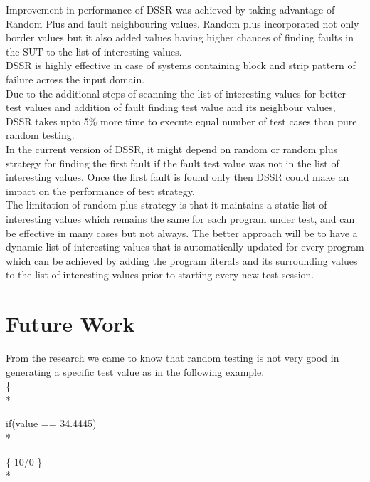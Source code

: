 \documentclass[10pt, conference, compsocconf]{IEEEtran}
\begin{document}
Improvement in performance of DSSR was achieved by taking advantage of Random Plus and fault neighbouring values. Random plus incorporated not only border values but it also added values having higher chances of finding faults in the SUT to the list of interesting values.\\

DSSR is highly effective in case of systems containing block and strip pattern of failure across the input domain.\\

Due to the additional steps of scanning the list of interesting values for better test values and addition of fault finding test value and its neighbour values, DSSR takes upto 5\% more time to execute equal number of test cases than pure random testing. \\

In the current version of DSSR, it might depend on random or random plus strategy for finding the first fault if the fault test value was not in the list of interesting values. Once the first fault is found only then DSSR could make an impact on the performance of test strategy.\\

The limitation of random plus strategy is that it maintains a static list of interesting values which remains the same for each program under test, and can be effective in many cases but not always. The better approach will be to have a dynamic list of interesting values that is automatically updated for every program which can be achieved by adding the program literals and its surrounding values to the list of interesting values prior to starting every new test session.


\section{Future Work}

From the research we came to know that random testing is not very good in generating a specific test value as in the following example.  \\

\{ \\*   

\hspace{07 mm}if(value == 34.4445) \\*

\hspace{07 mm}\{ 10/0 \} \\* 
\end{document}

